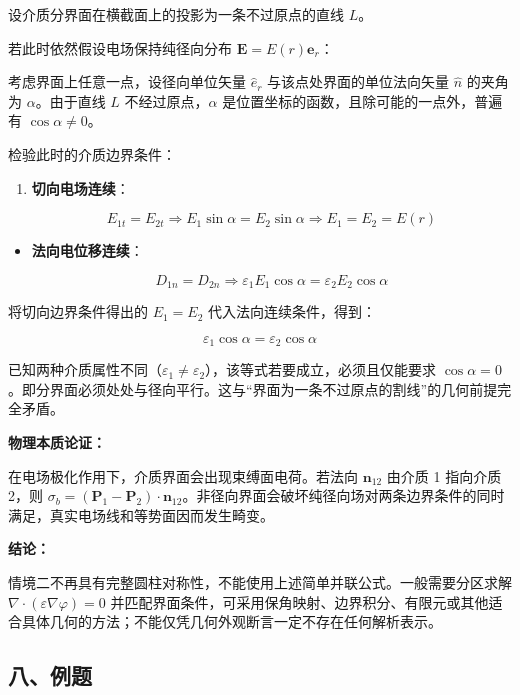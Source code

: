 设介质分界面在横截面上的投影为一条不过原点的直线 \(L\)。

若此时依然假设电场保持纯径向分布 \(\mathbf E=E(r)\mathbf e_r\)：

考虑界面上任意一点，设径向单位矢量 \(\hat{e}_r\)
与该点处界面的单位法向矢量 \(\hat{n}\) 的夹角为 \(\alpha\)。由于直线
\(L\) 不经过原点，\(\alpha\) 是位置坐标的函数，且除可能的一点外，普遍有
\(\cos\alpha \neq 0\)。

检验此时的介质边界条件：

\begin{enumerate}
\def\labelenumi{\arabic{enumi}.}
\item
  \textbf{切向电场连续}：

  \[
  E_{1t} = E_{2t} \Rightarrow E_1 \sin\alpha = E_2 \sin\alpha \Rightarrow E_1 = E_2 = E(r)
  \]
\end{enumerate}

\begin{itemize}
\item
  \textbf{法向电位移连续}：

  \[
  D_{1n} = D_{2n} \Rightarrow \varepsilon_1 E_1 \cos\alpha = \varepsilon_2 E_2 \cos\alpha
  \]
\end{itemize}

将切向边界条件得出的 \(E_1 = E_2\) 代入法向连续条件，得到：

\[
\varepsilon_1 \cos\alpha = \varepsilon_2 \cos\alpha
\]

已知两种介质属性不同（\(\varepsilon_1 \neq \varepsilon_2\)），该等式若要成立，必须且仅能要求
\(\cos\alpha = 0\)。即分界面必须处处与径向平行。这与``界面为一条不过原点的割线''的几何前提完全矛盾。

\textbf{物理本质论证：}

在电场极化作用下，介质界面会出现束缚面电荷。若法向 \(\mathbf n_{12}\)
由介质 1 指向介质 2，则
\(\sigma_b=(\mathbf P_1-\mathbf P_2)\cdot\mathbf n_{12}\)。非径向界面会破坏纯径向场对两条边界条件的同时满足，真实电场线和等势面因而发生畸变。

\textbf{结论：}

情境二不再具有完整圆柱对称性，不能使用上述简单并联公式。一般需要分区求解
\(\nabla\cdot(\varepsilon\nabla\varphi)=0\)
并匹配界面条件，可采用保角映射、边界积分、有限元或其他适合具体几何的方法；不能仅凭几何外观断言一定不存在任何解析表示。

\subsection{八、例题}\label{m3:ux516bux4f8bux9898}

